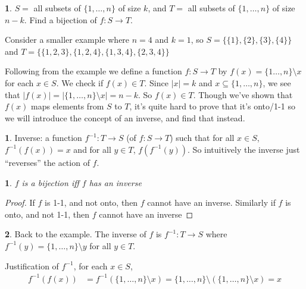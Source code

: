 \documentclass[english,12pt]{article}
\theoremstyle{plain}
\newtheorem*{theorem}{\protect\theoremname}
\theoremstyle{definition}
\newtheorem*{definition}{\protect\definitionname}
\newtheorem*{example}{\protect\examplename}
\theoremstyle{definition} %
\providecommand{\theoremname}{Theorem}
\providecommand{\definitionname}{Definition}
\providecommand{\examplename}{Example}
\begin{document}
\begin{example}
$S=$ all subsets of $\{1,\ldots, n\}$ of size $k$, and $T=$ all subsets of $\{1,\ldots, n\}$ of size $n-k$.  Find a bijection of $f:S\to T$.

Consider a smaller example where $n=4$ and $k=1$, so $S=\{\{1\},\{2\},\{3\},\{4\}\}$ and $T=\{\{1,2,3\},\{1,2,4\},\{1,3,4\},\{2,3,4\}\}$

Following from the example we define a function $f:S\to T$ by $f(x)=\{1\ldots, n\}\setminus x$ for each $x\in S$.  We check if $f(x)\in T$.  Since $|x|=k$ and $x\subseteq \{1,\ldots, n\}$, we see that $|f(x)|=|\{1,\ldots, n\}\setminus x| = n-k$.  So $f(x)\in T$.  Though we've shown that $f(x)$ maps elements from $S$ to $T$, it's quite hard to prove that it's onto/1-1 so we will introduce the concept of an inverse, and find that instead. 
\end{example}

\begin{definition}
Inverse: a function $f^{-1}:T\to S$ (of $f:S\to T$) such that for all $x\in S$, $f^{-1}(f(x)) = x$ and for all $y\in T$, $f(f^{-1}(y))$.  So intuitively the inverse just ``reverses'' the action of $f$.
\end{definition}

\begin{theorem}
$f$ is a bijection iff $f$ has an inverse
\end{theorem}

\begin{proof}
If $f$ is 1-1, and not onto, then $f$ cannot have an inverse.  Similarly if $f$ is onto, and not 1-1, then $f$ cannot have an inverse
\end{proof}

\begin{example}
Back to the example.  The inverse of $f$ is $f^{-1}:T\to S$ where $f^{-1}(y)=\{1,\ldots, n\}\setminus y$ for all $y\in T$.

Justification of $f^{-1}$, for each $x\in S$,
\begin{align*}
f^{-1}(f(x)) &= f^{-1}(\{1,\ldots, n\}\setminus x)
=\{1,\ldots, n\}\setminus (\{1,\ldots, n\}\setminus x)
=x
\end{align*}
\end{example}
\end{document}
